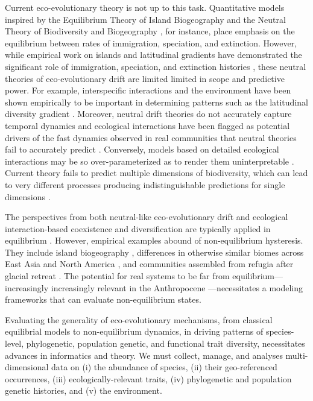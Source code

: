 \documentclass[11pt]{article}
\begin{document}
Current eco-evolutionary theory is not up to this task. Quantitative
models inspired by the Equilibrium Theory of Island Biogeography
\cite{MacArthur1967-ux} and the Neutral Theory of Biodiversity and
Biogeography \cite{Hubbell2001-dx}, for instance, place emphasis on
the equilibrium between rates of immigration, speciation, and
extinction. However, while empirical work on islands and latitudinal
gradients have demonstrated the significant role of immigration,
speciation, and extinction histories \cite{Gillespie2004-zv,
  Owens2017-ja}, these neutral theories of eco-evolutionary drift are
limited limited in scope and predictive power. For example,
interspecific interactions and the environment have been shown
empirically to be important in determining patterns such as the
latitudinal diversity gradient \cite{Janzen1967-fk, Mittelbach2007-ui,
  Pianka1966-ky}. Moreover, neutral drift theories do not accurately
capture temporal dynamics \cite{Ricklefs2006-tn, Chisholm2014-mu} and
ecological interactions have been flagged as potential drivers of the
fast dynamics observed in real communities that neutral theories fail
to accurately predict \cite{Rosindell2015-gp,
  Ricklefs2006-tn}. Conversely, models based on detailed ecological
interactions may be so over-parameterized as to render them
uninterpretable \cite{Rosindell2012-pm}. Current theory fails to
predict multiple dimensions of biodiversity, which can lead to very
different processes producing indistinguishable predictions for single
dimensions \cite{Chisholm2010-yg, McGill2003-sf, McGill2007-zd,
  Leibold2017-jv}.

The perspectives from both neutral-like eco-evolutionary drift and
ecological interaction-based coexistence and diversification are
typically applied in equilibrium \cite{Rominger_undated-cw,
  Etienne2007-we, Chesson2000-uc, Hubbell2001-dx}.  However, empirical
examples abound of non-equilibrium hysteresis. They include island
biogeography \cite{Ricklefs2001-af}, differences in otherwise similar
biomes across East Asia and North America
\cite{Qian2005-co,Yu2017-cc}, and communities assembled from refugia
after glacial retreat \cite{Carnaval2008-og, Carnaval2009-vd,
  Burbrink2016-nu}. The potential for real systems to be far from
equilibrium---increasingly increasingly relevant in the Anthropocene
\cite{Barnosky2012-qz}---necessitates a modeling frameworks that can
evaluate non-equilibrium states.

Evaluating the generality of eco-evolutionary mechanisms, from
classical equilibrial models to non-equilibrium dynamics, in driving
patterns of species-level, phylogenetic, population genetic, and
functional trait diversity, necessitates advances in informatics and
theory.  We must collect, manage, and analyses multi-dimensional data
on (i) the abundance of species, (ii) their geo-referenced
occurrences, (iii) ecologically-relevant traits, (iv) phylogenetic and
population genetic histories, and (v) the environment.
\end{document}
